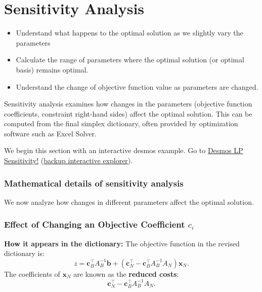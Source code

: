 \chapter{Sensitivity Analysis}
\begin{outcome}
\begin{itemize}
\item Understand what happens to the optimal solution as we slightly vary the parameters
\item Calculate the range of parameters where the optimal solution (or optimal basis) remains optimal.
\item Understand the change of objective function value as parameters are changed.
\end{itemize}
\end{outcome}


Sensitivity analysis examines how changes in the parameters (objective function coefficients, constraint right-hand sides) affect the optimal solution. This can be computed from the final simplex dictionary, often provided by optimization software such as Excel Solver.

We begin this section with an interactive desmos example.  Go to \href{https://www.desmos.com/calculator/xz1f0tdjf9}{Desmos LP Sensitivity!} (\href{https://open-optimization.github.io/open-optimization-or-book/interactive-figures/lp-sensitivity-explorer.html}{backup interactive explorer}).



\subsection{Mathematical details of sensitivity analysis}

We now analyze how changes in different parameters affect the optimal solution.

\subsection{Effect of Changing an Objective Coefficient \( c_i \)}

\textbf{How it appears in the dictionary:}  
The objective function in the revised dictionary is:
\[
z = \mathbf{c}_B^\top A_B^{-1} \mathbf{b} + (\mathbf{c}_N^\top - \mathbf{c}_B^\top A_B^{-1} A_N) \mathbf{x}_N.
\]
The coefficients of \( \mathbf{x}_N \) are known as the \textbf{reduced costs}:
\[
\mathbf{c}_N^\top - \mathbf{c}_B^\top A_B^{-1} A_N.
\]

